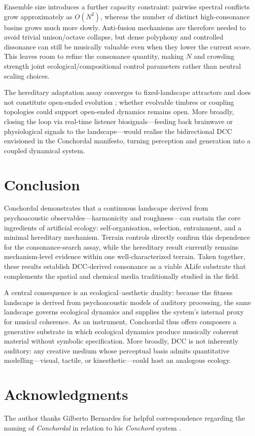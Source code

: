 \documentclass[letterpaper]{article}
\begin{document}
Ensemble size introduces a further capacity constraint: pairwise spectral conflicts grow approximately as $O(N^2)$, whereas the number of distinct high-consonance basins grows much more slowly. Anti-fusion mechanisms are therefore needed to avoid trivial unison/octave collapse, but dense polyphony and controlled dissonance can still be musically valuable even when they lower the current score. This leaves room to refine the consonance quantity, making $N$ and crowding strength joint ecological/compositional control parameters rather than neutral scaling choices.

The hereditary adaptation assay converges to fixed-landscape attractors and does not constitute open-ended evolution \citep{bedau2000}; whether evolvable timbres or coupling topologies could support open-ended dynamics remains open. More broadly, closing the loop via real-time listener biosignals---feeding back brainwave or physiological signals to the landscape---would realise the bidirectional DCC envisioned in the Conchordal manifesto, turning perception and generation into a coupled dynamical system.

\section{Conclusion}

Conchordal demonstrates that a continuous landscape derived from psychoacoustic observables---harmonicity and roughness---can sustain the core ingredients of artificial ecology: self-organisation, selection, entrainment, and a minimal hereditary mechanism. Terrain controls directly confirm this dependence for the consonance-search assay, while the hereditary result currently remains mechanism-level evidence within one well-characterized terrain. Taken together, these results establish DCC-derived consonance as a viable ALife substrate that complements the spatial and chemical media traditionally studied in the field.

A central consequence is an ecological--aesthetic duality: because the fitness landscape is derived from psychoacoustic models of auditory processing, the same landscape governs ecological dynamics and supplies the system's internal proxy for musical coherence. As an instrument, Conchordal thus offers composers a generative substrate in which ecological dynamics produce musically coherent material without symbolic specification. More broadly, DCC is not inherently auditory: any creative medium whose perceptual basis admits quantitative modelling---visual, tactile, or kinesthetic---could host an analogous ecology.

\section{Acknowledgments}

The author thanks Gilberto Bernardes for helpful correspondence regarding the naming of \textit{Conchordal} in relation to his \textit{Conchord} system \citep{bernardes2016}.


\footnotesize


\end{document}
